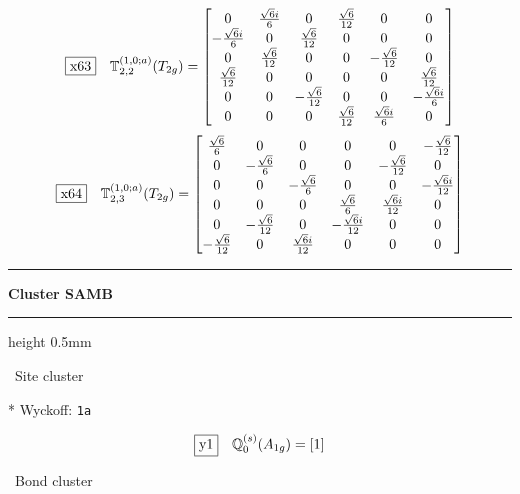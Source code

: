 \documentclass[fleqn,10pt,landscape]{jsarticle}
\begin{document}
\begin{dmath*}
\fbox{x63}\quad \mathbb{T}_{2,2}^{(1,0;a)}(T_{2g})=\begin{bmatrix} 0 & \frac{\sqrt{6} i}{6} & 0 & \frac{\sqrt{6}}{12} & 0 & 0 \\ - \frac{\sqrt{6} i}{6} & 0 & \frac{\sqrt{6}}{12} & 0 & 0 & 0 \\ 0 & \frac{\sqrt{6}}{12} & 0 & 0 & - \frac{\sqrt{6}}{12} & 0 \\ \frac{\sqrt{6}}{12} & 0 & 0 & 0 & 0 & \frac{\sqrt{6}}{12} \\ 0 & 0 & - \frac{\sqrt{6}}{12} & 0 & 0 & - \frac{\sqrt{6} i}{6} \\ 0 & 0 & 0 & \frac{\sqrt{6}}{12} & \frac{\sqrt{6} i}{6} & 0 \end{bmatrix}
\end{dmath*}
\begin{dmath*}
\fbox{x64}\quad \mathbb{T}_{2,3}^{(1,0;a)}(T_{2g})=\begin{bmatrix} \frac{\sqrt{6}}{6} & 0 & 0 & 0 & 0 & - \frac{\sqrt{6}}{12} \\ 0 & - \frac{\sqrt{6}}{6} & 0 & 0 & - \frac{\sqrt{6}}{12} & 0 \\ 0 & 0 & - \frac{\sqrt{6}}{6} & 0 & 0 & - \frac{\sqrt{6} i}{12} \\ 0 & 0 & 0 & \frac{\sqrt{6}}{6} & \frac{\sqrt{6} i}{12} & 0 \\ 0 & - \frac{\sqrt{6}}{12} & 0 & - \frac{\sqrt{6} i}{12} & 0 & 0 \\ - \frac{\sqrt{6}}{12} & 0 & \frac{\sqrt{6} i}{12} & 0 & 0 & 0 \end{bmatrix}
\end{dmath*}
\vspace{5mm}
\noindent \rule[0.5mm]{5mm}{0.5mm}\hspace{3mm}\textbf{Cluster SAMB}\hspace{3mm}\leaders\hrule height 0.5mm\hfill\kern0pt
\vspace{3mm}

\noindent\textbullet\, Site cluster

\vspace{5mm}

\noindent ** Wyckoff: \texttt{1a}

\begin{dmath*}
\fbox{y1}\quad \mathbb{Q}_{0}^{(s)}(A_{1g})=\left[ 1 \right]
\end{dmath*}
\vspace{5mm}

\noindent\textbullet\, Bond cluster
\end{document}
